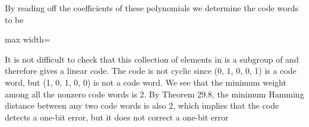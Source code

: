 \documentclass[11pt,oneside]{article}
\begin{document}
\begin{BookBody}
\noindent By reading off the coefficients of these polynomials we determine the code words to be

\begin{center}\begin{adjustbox}{max width=\linewidth}\end{adjustbox}\end{center}

\noindent It is not difficult to check that this collection of elements in  is a subgroup of  and therefore gives a linear code. The code is not cyclic since (0, 1, 0, 0, 1) is a code word, 
but (1, 0, 1, 0, 0) is not a code word. We see that the minimum weight among all the nonzero code words is 2. By Theorem 29.8, the minimum Hamming distance between any two code words is also 2, which implies that the code detects a one-bit error, but it does not correct a one-bit error\BookEnd{\blacktriangle}

\end{BookBody}

\BookNarrativetrue
\end{document}
